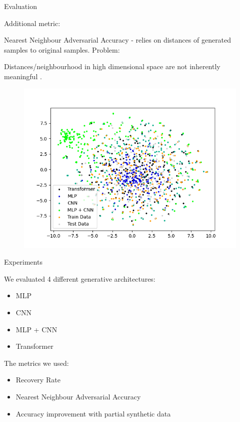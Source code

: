 \documentclass[compress, aspectratio=169]{beamer}
\begin{document}
\begin{frame}{Evaluation}
\begin{multicols}{2}
Additional metric: 

Nearest Neighbour Adversarial Accuracy \cite{yale2019privacy} - relies on distances of generated samples to original samples.
\bigbreak
Problem: 

Distances/neighbourhood in high dimensional space are not inherently meaningful \cite{beyer1999nearest}.
\columnbreak

\begin{figure}
    \centering
    \includegraphics[width=1.0\linewidth]{figures/umap_mlp_euclidean.png}
\end{figure}
\end{multicols}


    
\end{frame}

\begin{frame}{Experiments}

We evaluated 4 different generative architectures:

\begin{itemize}
    \item MLP
    \item CNN
    \item MLP + CNN
    \item Transformer
\end{itemize}

The metrics we used: 

\begin{itemize}
    \item Recovery Rate
    \item Nearest Neighbour Adversarial Accuracy
    \item Accuracy improvement with partial synthetic data
\end{itemize}
    
\end{frame}
\end{document}
